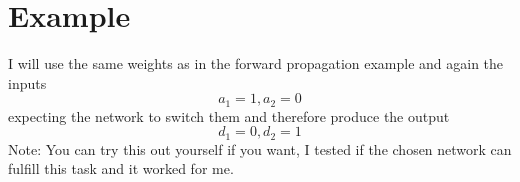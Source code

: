 \documentclass[11pt, halfparskip]{article}
\begin{document}
    \newpage
    \section{Example}
    \label{sec:example}
    I will use the same weights as in the forward propagation example and again the inputs
    \[
    	a_1 = 1, a_2 = 0
    \]
    expecting the network to switch them and therefore produce the output
    \[
    	d_1 = 0, d_2 = 1
    \]
    Note: You can try this out yourself if you want, I tested if the chosen network can fulfill this task and it worked for me.\\
    
\end{document}
